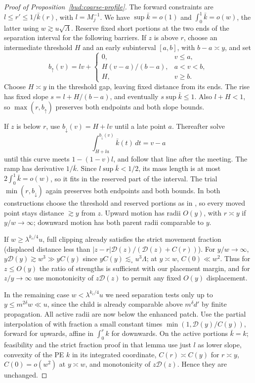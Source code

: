 \begin{proof}[Proof of Proposition~\ref{bud:coarse-profile}]
The forward constraints are
\(l\le r'\le1/\bar k(r)\), with \(l=M_j^{-1}\). We have
\(\sup\bar k=o(1)\) and \(\int_0^1\bar k=o(w)\), the latter
using \(w\gtrsim u\sqrt\Lambda\). Reserve fixed short portions
at the two ends of the separation interval for the following barriers.
If \(z\) is above \(r\), choose an intermediate threshold \(H\)
and an early subinterval \([a,b]\), with \(b-a\asymp y\), and set
\[
 b_\uparrow(v)=lv+
 \begin{cases}
 0,&v\le a,\\
 H(v-a)/(b-a),&a<v<b,\\
 H,&v\ge b.
 \end{cases}
\]
Choose \(H\asymp y\) in the threshold gap, leaving fixed distance
from its ends. The rise has fixed slope
\(s=l+H/(b-a)\), and eventually \(s\sup\bar k\le1\).
Also \(l+H<1\), so \(\max(r,b_\uparrow)\) preserves both
endpoints and both slope bounds.

If \(z\) is below \(r\), use \(b_\downarrow(v)=H+lv\) until
a late point \(a\). Thereafter solve
\[
 \int_{H+la}^{b_\downarrow(v)}\bar k(t)\,dt=v-a
\]
until this curve meets \(1-(1-v)l\), and follow that line after the
meeting. The ramp has derivative \(1/\bar k\). Since
\(l\sup\bar k<1/2\), its mass length is at most
\(2\int_0^1\bar k=o(w)\), so it fits in the reserved part of the
interval. The trial \(\min(r,b_\downarrow)\) again preserves both
endpoints and both bounds. In both constructions choose the threshold
and reserved portions as in \cite[Lemma~6.4]{PE}, so every moved point
stays distance \(\gtrsim y\) from \(z\). Upward motion has radii
\(O(y)\), with \(r\asymp y\) if \(y/w\to\infty\); downward
motion has both parent radii comparable to \(y\).

If \(w\ge\lambda^{k_c/4}u\), full clipping already satisfies the strict movement fraction (displaced distance less than \(|z-r|\mathcal D(z)/(\mathcal D(z)+C(r))\)). For \(y/w\to\infty\), \(y\mathcal D(y)\gtrsim w^3\gg y C(y)\) since \(y C(y)\lesssim_\circ u^3\Lambda\); at \(y\asymp w\), \(C(0)\ll w^2\). Thus for \(z\le O(y)\) the ratio of strengths is sufficient with our placement margin, and for \(z/y\to\infty\) use monotonicity of \(z\mathcal D(z)\) to permit any fixed \(O(y)\) displacement.

In the remaining case \(w<\lambda^{k_c/4}u\) we need separation tests only up to \(y\le m^{2\delta}w\ll u\), since the child is already comparable above \(m^\delta d'\) by finite propagation. All active radii are now below the enhanced patch. Use the partial interpolation of \cite[Lemma~6.4]{PE} with fraction a small constant times \(\min(1,\mathcal D(y)/C(y))\), forward for upwards, affine in \(\int_0^r k\) for downwards. On the active portions \(\bar k=k\); feasibility and the strict fraction proof in that lemma use just \(l\) as lower slope, convexity of the PE \(k\) in its integrated coordinate, \(C(r)\asymp C(y)\) for \(r\asymp y\), \(C(0)=o(w^2)\) at \(y\asymp w\), and monotonicity of \(z\mathcal D(z)\). Hence they are unchanged.


\end{proof}
